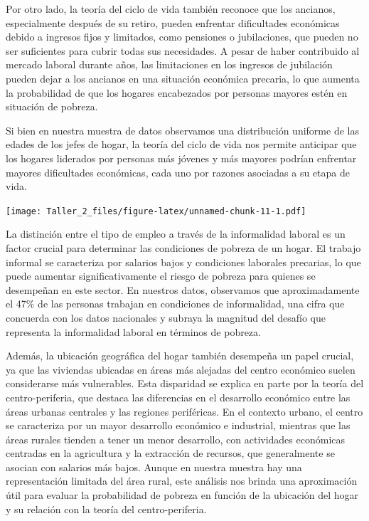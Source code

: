 \documentclass[
]{article}
\begin{document}
Por otro lado, la teoría del ciclo de vida también reconoce que los
ancianos, especialmente después de su retiro, pueden enfrentar
dificultades económicas debido a ingresos fijos y limitados, como
pensiones o jubilaciones, que pueden no ser suficientes para cubrir
todas sus necesidades. A pesar de haber contribuido al mercado laboral
durante años, las limitaciones en los ingresos de jubilación pueden
dejar a los ancianos en una situación económica precaria, lo que aumenta
la probabilidad de que los hogares encabezados por personas mayores
estén en situación de pobreza.

Si bien en nuestra muestra de datos observamos una distribución uniforme
de las edades de los jefes de hogar, la teoría del ciclo de vida nos
permite anticipar que los hogares liderados por personas más jóvenes y
más mayores podrían enfrentar mayores dificultades económicas, cada uno
por razones asociadas a su etapa de vida.

\texttt{[image: Taller\_2\_files/figure-latex/unnamed-chunk-11-1.pdf]}

La distinción entre el tipo de empleo a través de la informalidad
laboral es un factor crucial para determinar las condiciones de pobreza
de un hogar. El trabajo informal se caracteriza por salarios bajos y
condiciones laborales precarias, lo que puede aumentar
significativamente el riesgo de pobreza para quienes se desempeñan en
este sector. En nuestros datos, observamos que aproximadamente el 47\%
de las personas trabajan en condiciones de informalidad, una cifra que
concuerda con los datos nacionales y subraya la magnitud del desafío que
representa la informalidad laboral en términos de pobreza.

Además, la ubicación geográfica del hogar también desempeña un papel
crucial, ya que las viviendas ubicadas en áreas más alejadas del centro
económico suelen considerarse más vulnerables. Esta disparidad se
explica en parte por la teoría del centro-periferia, que destaca las
diferencias en el desarrollo económico entre las áreas urbanas centrales
y las regiones periféricas. En el contexto urbano, el centro se
caracteriza por un mayor desarrollo económico e industrial, mientras que
las áreas rurales tienden a tener un menor desarrollo, con actividades
económicas centradas en la agricultura y la extracción de recursos, que
generalmente se asocian con salarios más bajos. Aunque en nuestra
muestra hay una representación limitada del área rural, este análisis
nos brinda una aproximación útil para evaluar la probabilidad de pobreza
en función de la ubicación del hogar y su relación con la teoría del
centro-periferia.
\end{document}

